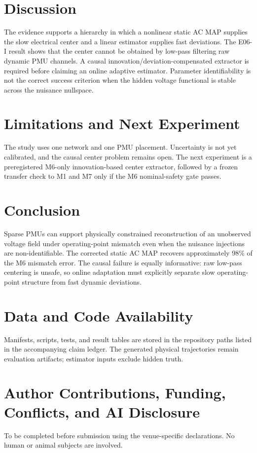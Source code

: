 \documentclass[journal]{IEEEtran}
\begin{document}
\section{Discussion}
The evidence supports a hierarchy in which a nonlinear static AC MAP supplies
the slow electrical center and a linear estimator supplies fast deviations.
The E06-I result shows that the center cannot be obtained by low-pass filtering
raw dynamic PMU channels. A causal innovation/deviation-compensated extractor
is required before claiming an online adaptive estimator. Parameter
identifiability is not the correct success criterion when the hidden voltage
functional is stable across the nuisance nullspace.

\section{Limitations and Next Experiment}
The study uses one network and one PMU placement. Uncertainty is not yet
calibrated, and the causal center problem remains open. The next experiment is
a preregistered M6-only innovation-based center extractor, followed by a
frozen transfer check to M1 and M7 only if the M6 nominal-safety gate passes.

\section{Conclusion}
Sparse PMUs can support physically constrained reconstruction of an unobserved
voltage field under operating-point mismatch even when the nuisance injections
are non-identifiable. The corrected static AC MAP recovers approximately 98\%
of the M6 mismatch error. The causal failure is equally informative: raw
low-pass centering is unsafe, so online adaptation must explicitly separate
slow operating-point structure from fast dynamic deviations.

\section*{Data and Code Availability}
Manifests, scripts, tests, and result tables are stored in the repository paths
listed in the accompanying claim ledger. The generated physical trajectories
remain evaluation artifacts; estimator inputs exclude hidden truth.

\section*{Author Contributions, Funding, Conflicts, and AI Disclosure}
To be completed before submission using the venue-specific declarations. No
human or animal subjects are involved.



\end{document}
